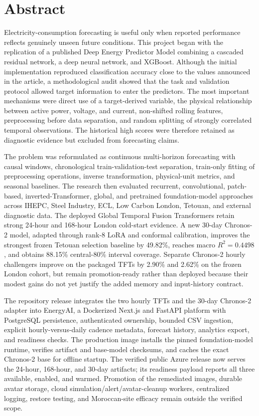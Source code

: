\chapter*{Abstract}
\enlargethispage{3\baselineskip}

Electricity-consumption forecasting is useful only when reported performance reflects genuinely unseen future conditions. This project began with the replication of a published Deep Energy Predictor Model combining a cascaded residual network, a deep neural network, and XGBoost. Although the initial implementation reproduced classification accuracy close to the values announced in the article, a methodological audit showed that the task and validation protocol allowed target information to enter the predictors. The most important mechanisms were direct use of a target-derived variable, the physical relationship between active power, voltage, and current, non-shifted rolling features, preprocessing before data separation, and random splitting of strongly correlated temporal observations. The historical high scores were therefore retained as diagnostic evidence but excluded from forecasting claims.

The problem was reformulated as continuous multi-horizon forecasting with causal windows, chronological train-validation-test separation, train-only fitting of preprocessing operations, inverse transformation, physical-unit metrics, and seasonal baselines. The research then evaluated recurrent, convolutional, patch-based, inverted-Transformer, global, and pretrained foundation-model approaches across IHEPC, Steel Industry, ECL, Low Carbon London, Tetouan, and external diagnostic data. The deployed Global Temporal Fusion Transformers retain strong 24-hour and 168-hour London cold-start evidence. A new 30-day Chronos-2 model, adapted through rank-8 LoRA and conformal calibration, improves the strongest frozen Tetouan selection baseline by 49.82\%, reaches macro $R^2=0.4498$, and obtains 88.15\% central-80\% interval coverage. Separate Chronos-2 hourly challengers improve on the packaged TFTs by 2.90\% and 2.62\% on the frozen London cohort, but remain promotion-ready rather than deployed because their modest gains do not yet justify the added memory and input-history contract.

The repository release integrates the two hourly TFTs and the 30-day Chronos-2 adapter into EnergyAI, a Dockerized Next.js and FastAPI platform with PostgreSQL persistence, authenticated ownership, bounded CSV ingestion, explicit hourly-versus-daily cadence metadata, forecast history, analytics export, and readiness checks. The production image installs the pinned foundation-model runtime, verifies artifact and base-model checksums, and caches the exact Chronos-2 base for offline startup. The verified public Azure release now serves the 24-hour, 168-hour, and 30-day artifacts; its readiness payload reports all three available, enabled, and warmed. Promotion of the remediated images, durable avatar storage, cloud simulation/alert/avatar-cleanup workers, centralized logging, restore testing, and Moroccan-site efficacy remain outside the verified scope.

